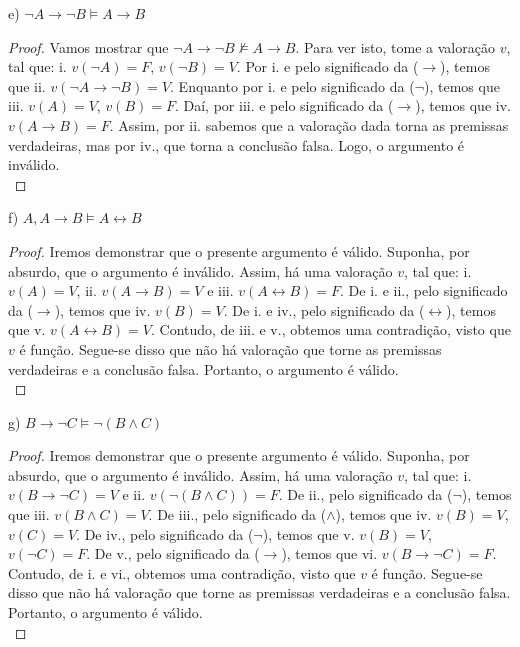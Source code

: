 \documentclass[12pt]{exam}
\begin{document}
\bigskip

e) $\neg A\rightarrow \neg B\vDash A\rightarrow B$

\begin{proof}
Vamos mostrar que $\neg A\rightarrow \neg B\nvDash A\rightarrow B$. Para ver isto, tome a valoração $v$, tal que: i. $v(\neg A)=F$, $v(\neg B)=V$. Por i. e pelo significado da ($\rightarrow$), temos que ii. $v(\neg A\rightarrow \neg B)=V$. Enquanto por i. e pelo significado da ($\neg$), temos que iii. $v(A)=V$, $v(B)=F$. Daí, por iii. e pelo significado da ($\rightarrow$), temos que iv.  $v(A\rightarrow B)=F$. Assim, por ii. sabemos que a valoração dada torna as premissas verdadeiras, mas por iv., que torna a conclusão falsa. Logo, o argumento é inválido.\\
\end{proof}

\pagebreak

f) $A, A\rightarrow B\vDash A\leftrightarrow B$

\begin{proof}
Iremos demonstrar que o presente argumento é válido. Suponha, por absurdo, que o argumento é inválido. Assim, há uma valoração $v$, tal que:
i. $v(A)=V$, 
ii. $v(A\rightarrow B)=V$ e 
iii. $v(A\leftrightarrow B)=F$. De i. e ii., pelo significado da ($\rightarrow$), temos que iv. $v(B)=V$. De i. e iv., pelo significado da ($\leftrightarrow$), temos que v. $v(A\leftrightarrow B)=V$. Contudo, de iii. e v., obtemos uma contradição, visto que $v$ é função. Segue-se disso que não há valoração que torne as premissas verdadeiras e a conclusão falsa. Portanto, o argumento é válido.\\
\end{proof}

\bigskip

g) $B\rightarrow \neg C\vDash \neg(B\land C)$

\begin{proof}
Iremos demonstrar que o presente argumento é válido. Suponha, por absurdo, que o argumento é inválido. Assim, há uma valoração $v$, tal que:
i. $v(B\rightarrow \neg C)=V$ e 
ii. $v(\neg(B\land C))=F$. De ii., pelo significado da ($\neg$), temos que iii. $v(B\land C)=V$. De iii., pelo significado da ($\land$), temos que iv. $v(B)=V$, $v(C)=V$. De iv., pelo significado da ($\neg$), temos que v. $v(B)=V$, $v(\neg C)=F$. De v., pelo significado da ($\rightarrow$), temos que vi. $v(B\rightarrow \neg C)=F$. Contudo, de i. e vi., obtemos uma contradição, visto que $v$ é função. Segue-se disso que não há valoração que torne as premissas verdadeiras e a conclusão falsa. Portanto, o argumento é válido.\\
\end{proof}
\end{document}
